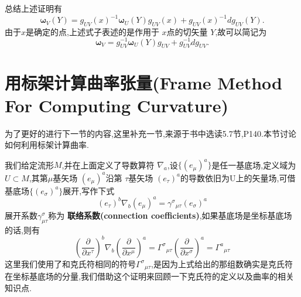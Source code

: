 \documentclass[../main.tex]{subfiles}
\begin{document}
总结上述证明有\[
\bm{\omega}_V(Y) = g_{UV}^{}(x)^{-1}\bm{\omega}_U(Y)g_{UV}(x) + g_{UV}(x)^{-1}dg_{UV}^{}(Y)
.\] 
由于$x$是确定的点,上述式子表述的是作用于 $x$点的切矢量 $Y$,故可以简记为 \[
\bm{\omega}_V = g_{UV}^{-1}\bm{\omega}_U(Y)g_{UV} + g_{UV}^{-1}dg_{UV}^{}
.\] 
\section{用标架计算曲率张量(Frame Method For Computing Curvature)}
为了更好的进行下一节的内容,这里补充一节,来源于书中选读5.7节,P140.本节讨论如何利用标架计算曲率.

我们给定流形$M$,并在上面定义了导数算符 $\nabla_a$,设$\{(e_\mu)^a\}$是任一基底场,定义域为$U \subset M$,其第$\mu$基矢场 $(e_\mu)^a$沿第 $\tau$基矢场 $(e_\tau)^a$的导数依旧为U上的矢量场,可借基底场$\{(e_\sigma)^a\}$展开,写作下式 
\begin{equation}
  (e_\tau)^b\nabla _b(e_\mu)^a = \gamma^{\sigma}{}_{\mu\tau}(e_\sigma)^a 
  \label{eq:I-2-7}
\end{equation}
展开系数$\gamma^\sigma_{\mu\tau}$称为 \textbf{联络系数(connection coefficients)},如果基底场是坐标基底场的话,则有
\begin{equation}
  (\frac{\partial   }{\partial x^\tau} )^b \nabla_b (\frac{\partial   }{\partial x^\mu} )^a = \Gamma^\sigma{}_{\mu\tau}(\frac{\partial   }{\partial x^\sigma} )^a =\Gamma^{a}{}_{\mu\tau} 
  \label{eq:I-2-8}
\end{equation}
这里我们使用了和克氏符相同的符号$\Gamma^\sigma{}_{\mu\tau}$,是因为上式给出的那组数确实是克氏符在坐标基底场的分量,我们借助这个证明来回顾一下克氏符的定义以及曲率的相关知识点.
\end{document}
